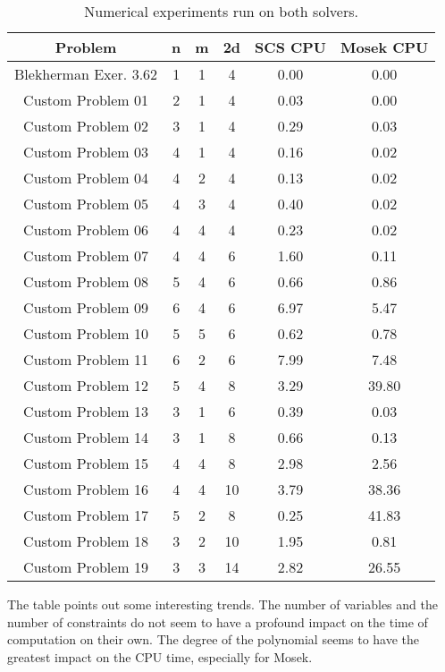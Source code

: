 		\begin{table}
		\begin{center}
			\begin{tabular}{||c | c | c | c | c | c||} 
				\hline
				Problem & n & m & 2d & SCS CPU & Mosek CPU \\
				\hline\hline
				Blekherman Exer. 3.62 & 1 & 1 & 4 & 0.00 & 0.00 \\
				\hline
				Custom Problem 01 & 2 & 1 & 4 & 0.03 & 0.00 \\
				\hline
				Custom Problem 02 & 3 & 1 & 4 & 0.29 & 0.03 \\
				\hline
				Custom Problem 03 & 4 & 1 & 4 & 0.16 & 0.02 \\
				\hline
				Custom Problem 04 & 4 & 2 & 4 & 0.13 & 0.02 \\
				\hline
				Custom Problem 05 & 4 & 3 & 4 & 0.40 & 0.02 \\
				\hline
				Custom Problem 06 & 4 & 4 & 4 & 0.23 & 0.02 \\
				\hline
				Custom Problem 07 & 4 & 4 & 6 & 1.60 & 0.11 \\
				\hline			
				Custom Problem 08 & 5 & 4 & 6 & 0.66 & 0.86 \\
				\hline
				Custom Problem 09 & 6 & 4 & 6 & 6.97 & 5.47 \\
				\hline
				Custom Problem 10 & 5 & 5 & 6 & 0.62 & 0.78 \\
				\hline
				Custom Problem 11 & 6 & 2 & 6 & 7.99 & 7.48 \\
				\hline
				Custom Problem 12 & 5 & 4 & 8 & 3.29 & 39.80 \\
				\hline
				Custom Problem 13 & 3 & 1 & 6 & 0.39 & 0.03 \\
				\hline
				Custom Problem 14 & 3 & 1 & 8 & 0.66 & 0.13 \\
				\hline
				Custom Problem 15 & 4 & 4 & 8 & 2.98 & 2.56 \\
				\hline
				Custom Problem 16 & 4 & 4 & 10 & 3.79 & 38.36 \\
				\hline
				Custom Problem 17 & 5 & 2 & 8 & 0.25 & 41.83 \\
				\hline
				Custom Problem 18 & 3 & 2 & 10 & 1.95 & 0.81 \\
				\hline
				Custom Problem 19 & 3 & 3 & 14 & 2.82 & 26.55 \\
				\hline				
			\end{tabular}
		\end{center} 
		\caption{Numerical experiments run on both solvers.}
		\end{table}
	The table points out some interesting trends. The number of variables and the number of constraints do not seem to have a profound impact on the time of computation on their own. The degree of the polynomial seems to have the greatest impact on the CPU time, especially for Mosek. 
	
